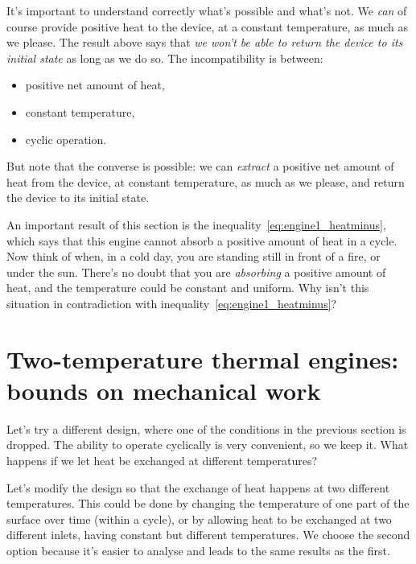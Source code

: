 \documentclass[a4paper,12pt,%
onecolumn,oneside,%
british%
]{memoir}
\renewcommand*{\|}[1][]{\nonscript\:#1\vert\nonscript\:\mathopen{}}
\begin{document}
\medskip

It's important to understand correctly what's possible and what's not. We \emph{can} of course provide positive heat to the device, at a constant temperature, as much as we please. The result above says that \emph{we won't be able to return the device to its initial state} as long as we do so. The incompatibility is between:
\begin{itemize}[nosep]
\item positive net amount of heat,
\item constant temperature,
\item cyclic operation.
\end{itemize}

But note that the converse is possible: we can \emph{extract} a positive net amount of heat from the device, at constant temperature, as much as we please, and return the device to its initial state.

\begin{exercise}
  An important result of this section is the inequality~\eqref{eq:engine1_heatminus}, which says that this engine cannot absorb a positive amount of heat in a cycle. Now think of when, in a cold day, you are standing still in front of a fire, or under the sun. There's no doubt that you are \emph{absorbing} a positive amount of heat, and the temperature could be constant and uniform. Why isn't this situation in contradiction with inequality~\eqref{eq:engine1_heatminus}?
\end{exercise}

\section{Two-temperature thermal engines: bounds on mechanical work}
\label{sec:heat_engine2}

Let's try a different design, where one of the conditions in the previous section is dropped. The ability to operate cyclically is very convenient, so we keep it. What happens if we let heat be exchanged at different temperatures?

Let's modify the design so that the exchange of heat happens at two different temperatures. This could be done by changing the temperature of one part of the surface over time (within a cycle), or by allowing heat to be exchanged at two different inlets, having constant but different temperatures. We choose the second option because it's easier to analyse and leads to the same results as the first.
\end{document}
